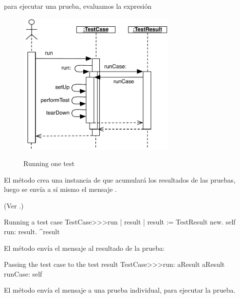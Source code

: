 \documentclass[a4paper,10pt,twoside]{book}
\begin{document}
para ejecutar una prueba, evaluamos la expresi\'on


\begin{figure}[tbh]
  \begin{center}
		{\includegraphics[width=0.7\textwidth]{sunit-scenario}}
	\caption{Running one test}
  \end{center}
\end{figure}

El m\'etodo  crea una instancia de 
 que acumular\'a los resultados de las pruebas, luego se env\'ia a s\'i mismo el mensaje  .

(Ver .)

\begin{method}[tastecaserun]{Running a test case}
TestCase>>>run
	| result |
	result := TestResult new.
	self run: result.
	^result
\end{method}


El m\'etodo 
 env\'ia el mensaje
 al resultado de la prueba:

\begin{method}[testcaserun:]{Passing the test case to the test result}
TestCase>>>run: aResult
	aResult runCase: self
\end{method}

El m\'etodo  env\'ia
el mensaje  a una prueba individual, para ejecutar la prueba.
\end{document}
